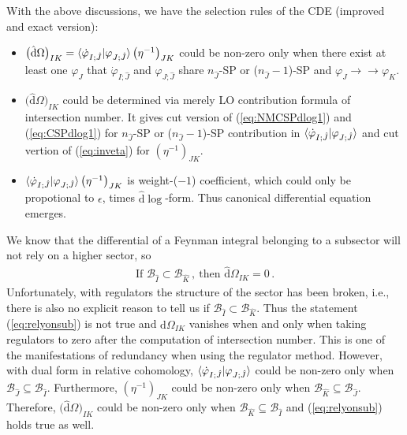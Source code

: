 \documentclass[a4paper,11pt]{article}
\newcommand{\nds}{\hat{\mathrm{d}}}
\newcommand{\ep}{\epsilon}
\def\eref#1{(\ref{#1})}
\begin{document}
With the above discussions,  we have the selection rules of the CDE (improved and exact version):
\begin{itemize}
\item $\big( \nds \Omega \big)_{IK} = \braket{\dot{\varphi}_{I;\hat{J}}|\varphi_{J;\hat{J}}} \big( \eta^{-1} \big)_{JK}$ could be non-zero only when there exist at least one $\varphi_J$ that $\dot{\varphi}_{I;\hat{J}}$ and $\varphi_{J;\hat{J}}$ share $n_{\hat{J}}$-SP or ($n_{\hat{J}}-1$)-SP  and $\varphi_J \rightarrow \rightarrow \varphi_K$.

\item $\big( \nds \Omega \big)_{IK}$ could be determined via merely LO contribution formula of intersection number. It gives cut version of \eref{eq:NMCSPdlog1} and \eref{eq:CSPdlog1} for $n_{\hat{J}}$-SP or ($n_{\hat{J}}-1$)-SP contribution in $\braket{\dot{\varphi}_{I;\hat{J}}|\varphi_{J;\hat{J}}}$ and cut vertion of \eref{eq:inveta} for $\left(\eta^{-1}\right)_{JK}$.
 
\item  $\braket{\dot{\varphi}_{I;\hat{J}}|\varphi_{J;\hat{J}}} \big( \eta^{-1} \big)_{JK}$ is  weight-($-1$) coefficient, which could only be propotional to $\ep$, times  $\nds \log$-form. Thus canonical differential equation emerges.
\end{itemize}

We know that the differential of a Feynman integral belonging to a subsector will not rely on a higher sector, so
\begin{align}
\text{If } \mathcal{B}_{\hat I} \subset \mathcal{B}_{\hat K}\, , \ \text{then } \nds \Omega_{IK} = 0  \, .  \label{eq:relyonsub}
\end{align}
Unfortunately, with regulators the structure of the sector has been broken, i.e., there is also no explicit reason to tell us if $\mathcal{B}_{\hat I} \subset \mathcal{B}_{\hat K}$. Thus the statement \eref{eq:relyonsub} is not true and  $\nds \Omega_{IK}$  vanishes when and only when taking regulators to  zero after the computation of intersection number. This is one of the manifestations of redundancy when using the regulator method.
However, with dual form in relative cohomology,  $\braket{\dot{\varphi}_{I;\hat{J}}|\varphi_{J;\hat{J}}}$ could be non-zero only when $\mathcal{B}_{\hat{J}} \subseteq \mathcal{B}_{\hat{I}}$. Furthermore, $(\eta^{-1})_{JK}$ could be non-zero only when $\mathcal{B}_{\hat{K}} \subseteq \mathcal{B}_{\hat{J}}$. Therefore, $\big( \nds \Omega \big)_{IK}$ could be non-zero only when $\mathcal{B}_{\hat{K}} \subseteq \mathcal{B}_{\hat{I}}$ and \eref{eq:relyonsub} holds true as well.
\end{document}
